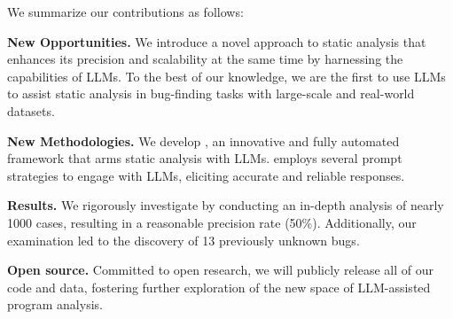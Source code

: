 
We summarize our contributions as follows: 
\squishlist
\item \textbf{New Opportunities.} We introduce a novel approach to static analysis that enhances its precision and scalability at the same time by harnessing the capabilities of LLMs. %
To the best of our knowledge, we are the first to use LLMs to assist static analysis in bug-finding tasks with large-scale and real-world datasets.
\item \textbf{New Methodologies.} We develop \work, an innovative and fully automated framework that arms static analysis with LLMs. \work employs several prompt strategies to engage with LLMs, eliciting accurate and reliable responses.
\item \textbf{Results.} We rigorously investigate \work by conducting an in-depth analysis of nearly 1000 cases, resulting in a reasonable precision rate (50\%). Additionally, our examination led to the discovery of 13 previously unknown bugs.
\item \textbf{Open source.} Committed to open research, we will publicly release all of our code and data, fostering further exploration of the new space of LLM-assisted program analysis.
\squishend





